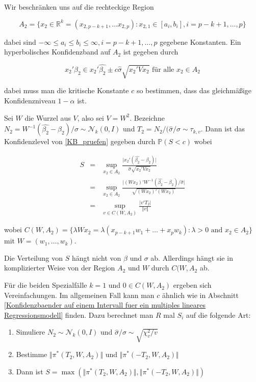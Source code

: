 \documentclass[12pt,a4paper]{article}
\theoremstyle{definition}
\theoremstyle{definition}
\theoremstyle{definition}
\begin{document}
Wir beschränken uns auf die rechteckige Region

\begin{equation*}
A_2 = \{ x_2 \in \mathbb{R}^k =(x_{2,p-k+1}, \ldots x_{2,p}) : x_{2,1} \in [a_i,b_i], i=p-k+1, \ldots, p \}
\end{equation*}

dabei sind $- \infty \leq a_i \leq b_i \leq \infty, i = p-k+1, \ldots, p$ gegebene Konstanten. Ein hyperbolisches Konfidenzband auf $A_2$ ist gegeben durch

\begin{equation}\label{KB_pruefen}
x_2'\beta_2 \in x_2'\hat{\beta_2} \pm c \hat{\sigma}\sqrt{x_2'Vx_2} \text{ für alle } x_2 \in A_2
\end{equation}

dabei muss man die kritische Konstante $c$ so bestimmen, dass das gleichmäßige Konfidenzniveau $1 - \alpha$ ist.

Sei $W$ die Wurzel aus $V$, also sei $V=W^2$. Bezeichne $N_2=W^{-1}(\hat{\beta_2}-\beta_2)/\sigma \sim \mathscr{N}_k(0,I)$ und $T_2 = N_2/(\hat{\sigma}/\sigma \sim \tau_{k,v}$. Dann ist das Konfidenzlevel von \eqref{KB_pruefen} gegeben durch $\mathbb{P}(S<c)$ wobei

\begin{eqnarray*}
S &=& \sup_{x_2 \in A_2} \frac{\vert x_2' (\hat{\beta_2} - \beta_2) \vert }{\hat{\sigma} \sqrt{x_2' V  x_2}} \\
&=& \sup_{x_2 \in A_2} \frac{\vert (Wx_2)'W^{-1} (\hat{\beta_2}-\beta_2)/\hat{\sigma} \vert}{\sqrt{(Wx_2)'(Wx_2)}} \\
&=& \sup_{v \in C(W,A_2)} \frac{\vert v'T_2 \vert }{\Vert v \Vert}
\end{eqnarray*}

wobei $C(W,A_2)=\{ \lambda W x_2 = \lambda(x_{p-k+1} w_1 + \ldots + x_p w_k) : \lambda > 0 \text{ and } x_2 \in A_2 \}$ mit $W=(w_1, \ldots, w_k)$. 

Die Verteilung von $S$ hängt nicht von $\beta$ und $\sigma$ ab. Allerdings hängt sie in komplizierter Weise von der Region $A_2$ und $W$ durch $C(W,A_2$ ab.

Für die beiden Spezialfälle $k=1$ und $0 \in C(W,A_2)$ ergeben sich Vereinfachungen. Im allgemeinen Fall kann man $c$ ähnlich wie in Abschnitt \ref{Konfidenzbaender auf einem Intervall fuer ein multiples lineares Regressionsmodell} finden. Dazu berechnet man $R$ mal $S_i$ auf die folgende Art:

\begin{enumerate}
\item Simuliere $N_2 \sim \mathscr{N}_k(0,I)$ und $\hat{\sigma}/\sigma \sim \sqrt{\chi^2_v/v}$
\item Bestimme $\Vert \pi^{*}(T_2,W,A_2) \Vert$ und $\Vert \pi^{*}(-T_2,W,A_2) \Vert$
\item Dann ist $S= \max(\Vert \pi^{*}(T_2,W,A_2) \Vert, \Vert \pi^{*}(-T_2,W,A_2) \Vert )$
\end{enumerate}
\end{document}
